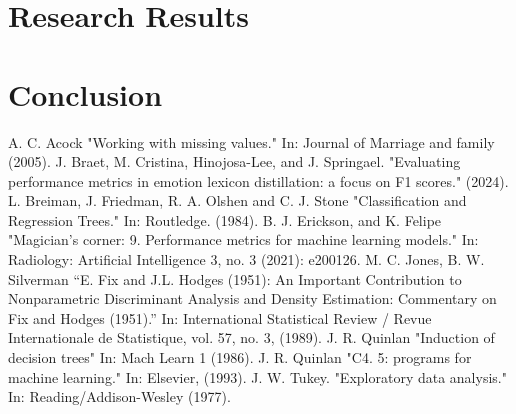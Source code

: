 \documentclass[10pt, conference]{IEEEtran}
\begin{document}
\section{Research Results} \label{section:Research Results}
\section{Conclusion} \label{section:Conclusion}
\begin{thebibliography}{00}
     A. C. Acock "Working with missing values." In: Journal of Marriage and family (2005).
     J. Braet, M. Cristina, Hinojosa-Lee, and J. Springael. "Evaluating performance metrics in emotion lexicon distillation: a focus on F1 scores." (2024).
     L. Breiman, J. Friedman, R. A. Olshen and C. J. Stone "Classification and Regression Trees." In: Routledge.  (1984).
     B. J. Erickson, and K. Felipe "Magician’s corner: 9. Performance metrics for machine learning models." In: Radiology: Artificial Intelligence 3, no. 3 (2021): e200126.
     M. C. Jones, B. W. Silverman “E. Fix and J.L. Hodges (1951): An Important Contribution to Nonparametric Discriminant Analysis and Density Estimation: Commentary on Fix and Hodges (1951).” In: International Statistical Review / Revue Internationale de Statistique, vol. 57, no. 3, (1989).
     J. R. Quinlan "Induction of decision trees" In: Mach Learn 1 (1986).
     J. R. Quinlan "C4. 5: programs for machine learning." In: Elsevier, (1993).
     J. W. Tukey. "Exploratory data analysis." In: Reading/Addison-Wesley (1977).
\end{thebibliography}


\printglossary[type=\acronymtype]

\clearpage
\end{document}
